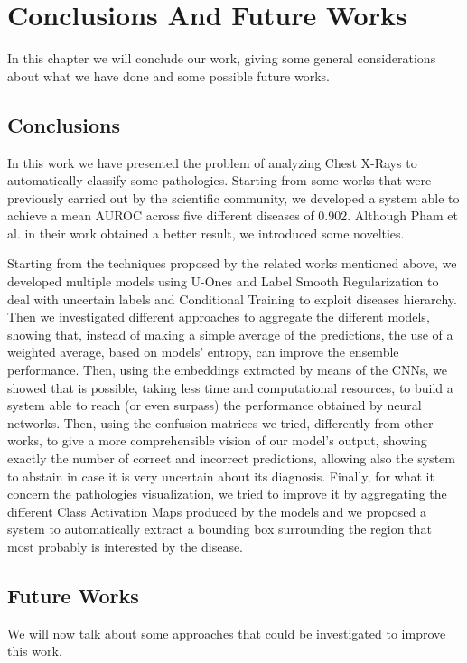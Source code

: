 \chapter{Conclusions And Future Works}
\label{cha:conclusions}

In this chapter we will conclude our work, giving some general considerations about what we have done and some possible future works. 

\section{Conclusions}
\label{sec:conclusions}
In this work we have presented the problem of analyzing Chest X-Rays to automatically classify some pathologies. Starting from some works that were previously carried out by the scientific community, we developed a system able to achieve a mean AUROC across five different diseases of 0.902. Although Pham et al. \cite{pham2019interpreting} in their work obtained a better result, we introduced some novelties. 

\vspace{5mm}

Starting from the techniques proposed by the related works mentioned above, we developed multiple models using U-Ones and Label Smooth Regularization to deal with uncertain labels and Conditional Training to exploit diseases hierarchy. Then we investigated different approaches to aggregate the different models, showing that, instead of making a simple average of the predictions, the use of a weighted average, based on models' entropy, can improve the ensemble performance. Then, using the embeddings extracted by means of the \acp{CNN}, we showed that is possible, taking less time and computational resources, to build a system able to reach (or even surpass) the performance obtained by neural networks. Then, using the confusion matrices we tried, differently from other works, to give a more comprehensible vision of our model's output, showing exactly the number of correct and incorrect predictions, allowing also the system to abstain in case it is very uncertain about its diagnosis. 
Finally, for what it concern the pathologies visualization, we tried to improve it by aggregating the different Class Activation Maps produced by the models and we proposed a system to automatically extract a bounding box surrounding the region that most probably is interested by the disease. 

\section{Future Works}
\label{sec:future_works}
We will now talk about some approaches that could be investigated to improve this work.


